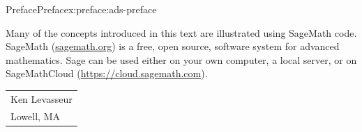 \documentclass[oneside,10pt,]{book}
\begin{document}
\begin{preface}{Preface}{}{Preface}{}{}{x:preface:ads-preface}
\par
Many of the concepts introduced in this text are illustrated using SageMath code.  SageMath (\href{http://sagemath.org}{sagemath.org}) is a free, open source, software system for advanced mathematics.  Sage can be used either on your own computer, a local server, or on SageMathCloud (\href{https://cloud.sagemath.com}{https:\slash{}\slash{}cloud.sagemath.com}).%
\nopagebreak\par%
\hfill\begin{tabular}[t]{l@{}}
Ken Levasseur\\
Lowell, MA
\end{tabular}\\\par
\end{preface}
\setcounter{tocdepth}{1}
\renewcommand*\contentsname{Contents}
\tableofcontents
\mainmatter
%
%
\typeout{************************************************}
\typeout{************************************************}
%
\end{document}
